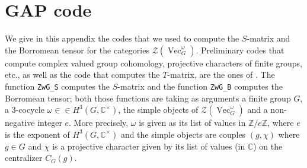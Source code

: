 \documentclass[11pt]{book}
\theoremstyle{Rem}
\theoremstyle{definition}
\numberwithin{equation}{section}
\newcommand\Vect{\operatorname{Vec}}
\newcommand\CC{\mathbb C}
\newcommand\ZZ{\mathbb Z}
\newcommand\CCu{\CC^\times}
\newcommand\CTR{\mathcal Z}
\begin{document}
\section{GAP code}
We give in this appendix the codes that we used to compute the $S$-matrix and the Borromean tensor for the categories $\CTR(\Vect_G^\omega)$. Preliminary codes that compute complex valued group cohomology, projective characters of finite groups, etc., as well as the code that computes the $T$-matrix, are the ones of \cite{2017arXiv170806538M}. The function \lstinline!ZwG_S! computes the $S$-matrix and the function \lstinline!ZwG_B! computes the Borromean tensor; both those functions are taking as arguments a finite group $G$, a $3$-cocycle $\omega \in \in H^3(G,\CCu)$, the simple objects of $\CTR(\Vect_G^\omega)$ and a non-negative integer $e$. More precisely, $\omega$ is given as its list of values in $\ZZ/e\ZZ$, where $e$ is the exponent of $H^3(G,\CCu)$ and the simple objects are couples $(g,\chi)$ where $g \in G$ and $\chi$ is a projective character given by its list of values (in $\CC$) on the centralizer $C_G(g)$.\\
\end{document}
